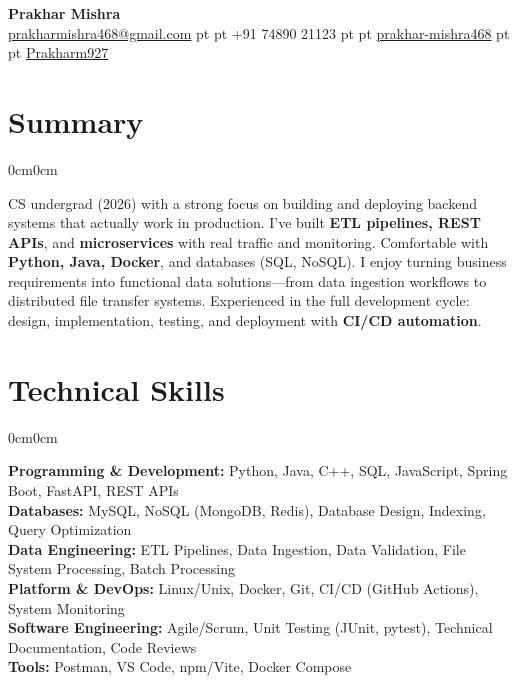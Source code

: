\documentclass[10pt, letterpaper]{article}
\newenvironment{onecolentry}{
    \begin{adjustwidth}{0cm}{0cm}
}{
    \end{adjustwidth}
}
\newenvironment{header}{
    \centering\linespread{1.2}
}{
}
\begin{document}
\begin{header}
    \fontsize{20 pt}{20 pt}\selectfont \textbf{Prakhar Mishra}\\[2 pt]
    \vspace{2 pt}
    \normalsize
    \href{mailto:prakharmishra468@gmail.com}{\faEnvelope \hspace{1pt} prakharmishra468@gmail.com}%
     pt \textbar{}  pt%
    \faPhone \hspace{2pt} +91 74890 21123%
     pt \textbar{}  pt%
    \href{https://linkedin.com/in/prakhar-mishra468}{\faLinkedin \hspace{2pt} prakhar-mishra468}%
     pt \textbar{}  pt%
    \href{https://github.com/Prakharm927}{\faGithub \hspace{2pt} Prakharm927}
\end{header}

\vspace{1 pt}

\section{Summary}
\begin{onecolentry}
CS undergrad (2026) with a strong focus on building and deploying backend systems that actually work in production. I've built \textbf{ETL pipelines, REST APIs}, and \textbf{microservices} with real traffic and monitoring. Comfortable with \textbf{Python, Java, Docker}, and databases (SQL, NoSQL). I enjoy turning business requirements into functional data solutions—from data ingestion workflows to distributed file transfer systems. Experienced in the full development cycle: design, implementation, testing, and deployment with \textbf{CI/CD automation}.
\end{onecolentry}

\section{Technical Skills}
\begin{onecolentry}
\textbf{Programming \& Development:} Python, Java, C++, SQL, JavaScript, Spring Boot, FastAPI, REST APIs \\
\textbf{Databases:} MySQL, NoSQL (MongoDB, Redis), Database Design, Indexing, Query Optimization \\
\textbf{Data Engineering:} ETL Pipelines, Data Ingestion, Data Validation, File System Processing, Batch Processing \\
\textbf{Platform \& DevOps:} Linux/Unix, Docker, Git, CI/CD (GitHub Actions), System Monitoring \\
\textbf{Software Engineering:} Agile/Scrum, Unit Testing (JUnit, pytest), Technical Documentation, Code Reviews \\
\textbf{Tools:} Postman, VS Code, npm/Vite, Docker Compose
\end{onecolentry}
\end{document}
